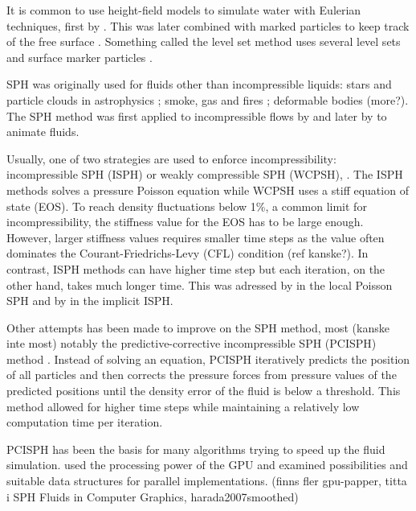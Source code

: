 \documentclass[../../main.tex]{subfiles}
\begin{document}
\tracingall

It is common to use height-field models to simulate water with Eulerian techniques, first by \citet{kass1990rapid}. This was later combined with marked particles to keep track of the free surface \citep{foster1996realistic}. Something called the level set method uses several level sets and surface marker particles \citep{enright2002hybrid}. 

SPH was originally used for fluids other than incompressible liquids: stars and particle clouds in astrophysics \citep{lucy1977numerical, gingold1977smoothed}; smoke, gas and fires \citep{stam1995depicting}; deformable bodies \citep{desbrun1996smoothed} (more?). The SPH method was first applied to incompressible flows by \citet{monaghan1994simulating} and later by \citet{muller2003particle} to animate fluids. 

Usually, one of two strategies are used to enforce incompressibility: incompressible SPH (ISPH) or weakly compressible SPH (WCPSH), \citep{becker2007weakly}. The ISPH methods solves a pressure Poisson equation while WCPSH uses a stiff equation of state (EOS). To reach density fluctuations below 1\%, a common limit for incompressibility, the stiffness value for the EOS has to be large enough. However, larger stiffness values requires smaller time steps as the value often dominates the Courant-Friedrichs-Levy (CFL) condition (ref kanske?). In contrast, ISPH methods can have higher time step but each iteration, on the other hand, takes much longer time. This was adressed by \citet{he2012local} in the local Poisson SPH and by \citet{ihmsen2014implicit} in the implicit ISPH. 

Other attempts has been made to improve on the SPH method, most (kanske inte most) notably the predictive-corrective incompressible SPH (PCISPH) method \citep{solenthaler2009predictive}. Instead of solving an equation, PCISPH iteratively predicts the position of all particles and then corrects the pressure forces from pressure values of the predicted positions until the density error of the fluid is below a threshold. This method allowed for higher time steps while maintaining a relatively low computation time per iteration. 

PCISPH has been the basis for many algorithms trying to speed up the fluid simulation. \citet{goswami2010interactive} used the processing power of the GPU and \citet{ihmsen2011parallel} examined possibilities and suitable data structures for parallel implementations. (finns fler gpu-papper, titta i SPH Fluids in Computer Graphics, harada2007smoothed)
\end{document}
